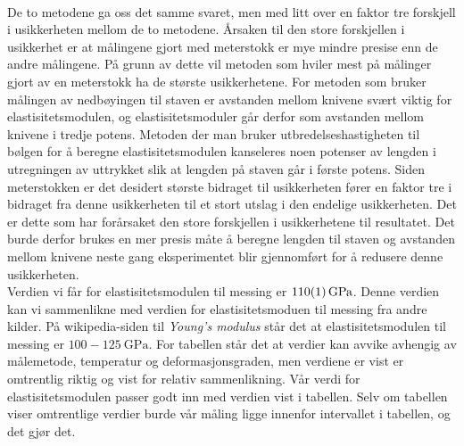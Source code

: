 \documentclass[%
 reprint,
 amsmath,amssymb,
 aps,
 norsk,
 booktabs
]{revtex4-1}
\begin{document}
\\De to metodene ga oss det samme svaret, men med litt over en faktor tre forskjell i usikkerheten mellom de to metodene. Årsaken til den store forskjellen i usikkerhet er at målingene gjort med meterstokk er mye mindre presise enn de andre målingene. På grunn av dette vil metoden som hviler mest på målinger gjort av en meterstokk ha de største usikkerhetene. For metoden som bruker målingen av nedbøyingen til staven er avstanden mellom knivene svært viktig for elastisitetsmodulen, og elastisitetsmoduler går derfor som avstanden mellom knivene i tredje potens. Metoden der man bruker utbredelseshastigheten til bølgen for å beregne elastisitetsmodulen kanseleres noen potenser av lengden i utregningen av uttrykket slik at lengden på staven går i første potens. Siden meterstokken er det desidert største bidraget til usikkerheten fører en faktor tre i bidraget fra denne usikkerheten til et stort utslag i den endelige usikkerheten. Det er dette som har forårsaket den store forskjellen i usikkerhetene til resultatet. Det burde derfor brukes en mer presis måte å beregne lengden til staven og avstanden mellom knivene neste gang eksperimentet blir gjennomført for å redusere denne usikkerheten.\\
Verdien vi får for elastisitetsmodulen til messing er $\SI{110\pm1}{\giga\pascal}$. Denne verdien kan vi sammenlikne med verdien for elastisitetsmoduen til messing fra andre kilder. På wikipedia-siden til \textit{Young's modulus} \cite{wiki1} står det at elastisitetsmodulen til messing er $100-\SI{125}{\giga\pascal}$. For tabellen står det at verdier kan avvike avhengig av målemetode, temperatur og deformasjonsgraden, men verdiene er vist er omtrentlig riktig og vist for relativ sammenlikning. Vår verdi for elastisitetsmodulen passer godt inn med verdien vist i tabellen. Selv om tabellen viser omtrentlige verdier burde vår måling ligge innenfor intervallet i tabellen, og det gjør det.
\end{document}
